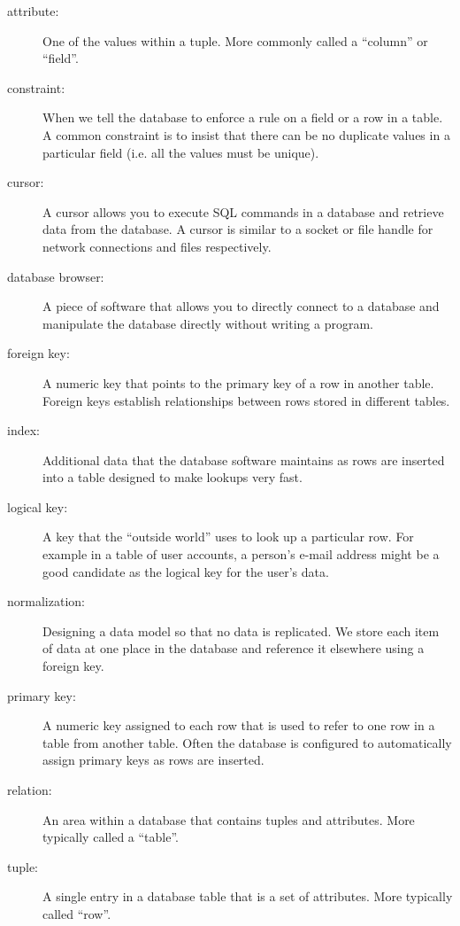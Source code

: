 \begin{description}

\item[attribute:] One of the values within a tuple.  More commonly
called a ``column'' or ``field''.

\item[constraint:] 
When we tell the database to enforce a rule on a field or a row
in a table.  A common constraint is to insist that there can be no
duplicate values in a particular field (i.e. all the values must be unique).

\item[cursor:] A cursor allows you to execute SQL commands in a database
and retrieve data from the database.  A cursor is similar to 
a socket or file handle for network connections and files respectively.

\item[database browser:] 
A piece of software that allows you to directly connect to a database 
and manipulate the database directly without writing a program.

\item[foreign key:] A numeric key that points to the primary key of 
a row in another table.  Foreign keys establish relationships between rows
stored in different tables.

\item[index:] Additional data that the database software maintains as rows
are inserted into a table designed to make lookups very fast.

\item[logical key:] A key that the ``outside world'' uses to look up a particular
row.  For example in a table of user accounts, a person's e-mail address
might be a good candidate as the logical key for the user's data. 

\item[normalization:] Designing a data model so that no data
is replicated.  We store each item of data at one place in the database
and reference it elsewhere using a foreign key.

\item[primary key:] A numeric key assigned to each row that is used to 
refer to one row in a table from another table.  Often the database
is configured to automatically assign primary keys as rows are inserted.

\item[relation:] An area within a database that contains tuples and 
attributes.  More typically called a ``table''.

\item[tuple:] A single entry in a database table that is a set 
of attributes.  More typically called ``row''.

\end{description}

